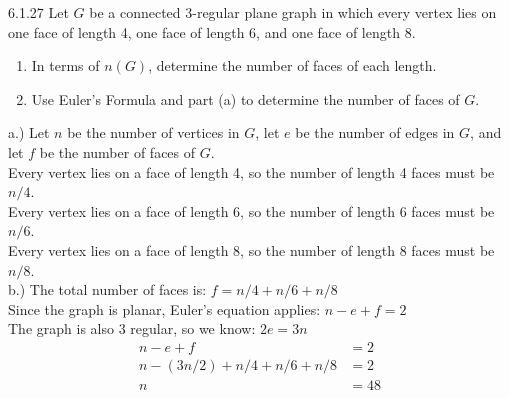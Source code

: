 \documentclass[12pt]{article}
\newenvironment{question}[2][Question]{\begin{trivlist}
\item[\hskip \labelsep {\bfseries #1}\hskip \labelsep {\bfseries #2.}]}{\end{trivlist}}
\begin{document}
\begin{question}{2} - 
6.1.27  Let $G$ be a connected 3-regular plane graph in which every vertex lies on one face of length 4, one face of length 6, and one face of length 8.
\begin{enumerate}[label=\alph*)]
  \item In terms of $n(G)$, determine the number of faces of each length.
  \item Use Euler's Formula and part (a) to determine the number of faces of $G$.
\end{enumerate}

a.) Let $n$ be the number of vertices in $G$, let $e$ be the number of edges in $G$, and let $f$ be the number of faces of $G$.  \\
Every vertex lies on a face of length 4, so the number of length 4 faces must be $n/4$. \\
Every vertex lies on a face of length 6, so the number of length 6 faces must be $n/6$. \\
Every vertex lies on a face of length 8, so the number of length 8 faces must be $n/8$. \\

b.) 
The total number of faces is: $f = n/4 + n/6 + n/8$ \\
Since the graph is planar, Euler's equation applies: $ n-e+f=2$ \\
The graph is also 3 regular, so we know: $2e = 3n $ \\

\begin{equation}
\begin{split}
n-e+f & = 2  \\
n - (3n/2) + n/4 +n/6 +n/8 & = 2 \\
n & = 48
\end{split}
\end{equation}


\end{question}
\end{document}
